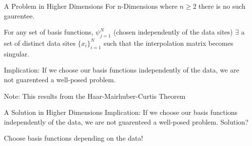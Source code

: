 \documentclass[12pt,t]{beamer}
\newcommand{\subt}[1]{{\footnotesize \color{subtitle} {#1}}}
\begin{document}
\begin{frame}{A Problem in Higher Dimensions}
For n-Dimensions where $n\geq 2$ there is no such gaurentee.
\bigskip

For any set of basis functions, $\psi_{j=1}^N$ (chosen independently of the data sites) $\exists$ a set of distinct data sites $\{x_i\}_{i=1}^N$
such that the interpolation matrix becomes singular. 
\bigskip

\subt{Implication:}
If we choose our basis functions independently of the data, we are not guarenteed a well-posed problem.
\bigskip

\subt{Note:}
This results from the Haar-Mairhuber-Curtis Theorem


\note{}
\end{frame}

\begin{frame}[c]{A Solution in Higher Dimensions}
\subt{Implication:}
If we choose our basis functions independently of the data, we are not guarenteed a well-posed problem.
\bigskip
\subt{Solution?}

Choose basis functions depending on the data!
\bigskip

\note{}
\end{frame}
\end{document}
